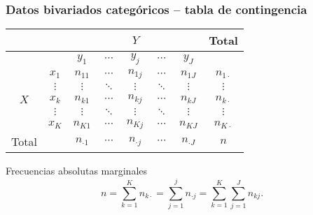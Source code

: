 \documentclass[table]{beamer}
\begin{document}
\begin{frame}
    \frametitle{Datos bivariados categóricos -- tabla de contingencia}
    \begin{center}
        \begin{tabular}{c|c|ccccc|c}
            & & \multicolumn{5}{c|}{$Y$} & Total \\
            \hline
            & & $y_{1}$ & $\cdots$ & $y_{j}$ & $\cdots$ & $y_{J}$ & \\
            \hline
            & $x_{1}$ & $n_{11}$ & $\cdots$ & $n_{1j}$ & $\cdots$ & $n_{1J}$ & $n_{1 \cdot}$ \\
             & $\vdots$ & $\vdots$ & $\ddots$ & $\vdots$ & $\ddots$ & $\vdots$ & $\vdots$ \\
            $X$ & $x_{k}$ & $n_{k1}$ & $\cdots$ & $n_{kj}$ & $\cdots$ & $n_{kJ}$ & $n_{k \cdot}$ \\
             & $\vdots$ & $\vdots$ & $\ddots$ & $\vdots$ & $\ddots$ & $\vdots$ & $\vdots$ \\
            & $x_{K}$ & $n_{K1}$ & $\cdots$ & $n_{Kj}$ & $\cdots$ & $n_{KJ}$ & $n_{K \cdot}$ \\
            \hline
            Total & & $n_{\cdot 1}$ & $\cdots$ & $n_{\cdot j}$ & $\cdots$ & $n_{\cdot J}$ & $n$ \\
        \end{tabular}
    \end{center}
    \begin{block}{Frecuencias absolutas marginales}
        \begin{equation*}
            n = \sum_{k = 1}^{K} n_{k \cdot} = \sum_{j = 1}^{j} n_{\cdot j} = \sum_{k = 1}^{K} \sum_{j = 1}^{J} n_{k j} .
        \end{equation*}
    \end{block}
\end{frame}
\end{document}
